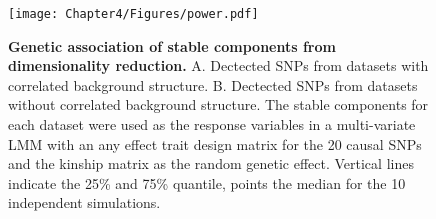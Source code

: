 \begin{figure}[hbtp]
	\centering
	\texttt{[image: Chapter4/Figures/power.pdf]}
	\caption[\textbf{Genetic association of stable components from dimensionality reduction.}]{\textbf{Genetic association of stable components from dimensionality reduction. } A. Dectected SNPs from datasets with correlated background structure. B.  Dectected SNPs from datasets without correlated background structure. The stable components for each dataset were used as the response variables in a multi-variate LMM with an any effect trait design matrix for the \num{20} causal SNPs and the kinship matrix as the random genetic effect. Vertical lines indicate the \num{25}\% and \num{75}\% quantile, points the median for the \num{10} independent simulations. } 
	 	\label{fig:power-dimRed}
\end{figure}

